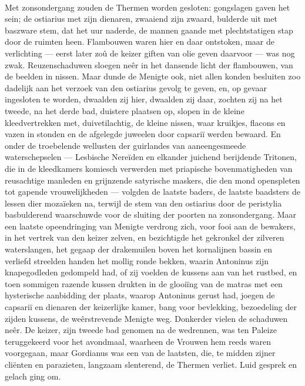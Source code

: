 \documentclass[a4paper, 12pt, oneside, dutch]{article}
\begin{document}
\paragraph{}
Met zonsondergang zouden de Thermen worden gesloten: gongslagen gaven het sein; de ostiarius met zijn dienaren, zwaaiend zijn zwaard, bulderde uit met baszware stem, dat het uur naderde, de mannen gaande met plechtstatigen stap door de ruimten heen. Flambouwen waren hier en daar ontstoken, maar de verlichting --- eerst later zoû de keizer giften van olie geven daarvoor --- was nog zwak. Reuzenschaduwen sloegen neêr in het dansende licht der flambouwen, van de beelden in nissen. Maar dunde de Menigte ook, niet allen konden besluiten zoo dadelijk aan het verzoek van den ostiarius gevolg te geven, en, op gevaar ingesloten te worden, dwaalden zij hier, dwaalden zij daar, zochten zij na het tweede, na het derde bad, duistere plaatsen op, slopen in de kleine kleedvertrekken met, duivetilachtig, de kleine nissen, waar kruikjes, flacons en vazen in stonden en de afgelegde juweelen door capsariï werden bewaard. En onder de troebelende wellusten der guirlandes van aaneengesmeede waterschepselen --- Lesbische Nereïden en elkander juichend berijdende Tritonen, die in de kleedkamers komiesch verwerden met priapische bovenmatigheden van reusachtige manleden en grijnzende satyrische maskers, die den mond openspleten tot gapende vrouwelijkheden --- volgden de laatste baders, de laatste baadsters de lessen dier mozaïeken na, terwijl de stem van den ostiarius door de peristylia basbulderend waarschuwde voor de sluiting der poorten na zonsondergang. Maar een laatste opeendringing van Menigte verdrong zich, voor fooi aan de bewakers, in het vertrek van den keizer zelven, en bezichtigde het gekronkel der zilveren waterslangen, het gegaap der drakemuilen boven het kornalijnen bassin en verliefd streelden handen het mollig ronde bekken, waarin Antoninus zijn knapegodleden gedompeld had, of zij voelden de kussens aan van het rustbed, en toen sommigen razende kussen drukten in de glooiïng van de matras met een hysterische aanbidding der plaats, waarop Antoninus gerust had, joegen de capsariï en dienaren der keizerlijke kamer, bang voor bevlekking, bezoedeling der zijden kussens, de weêrstrevende Menigte weg. Donkerder vielen de schaduwen neêr. De keizer, zijn tweede bad genomen na de wedrennen, was ten Paleize teruggekeerd voor het avondmaal, waarheen de Vrouwen hem reeds waren voorgegaan, maar Gordianus was een van de laatsten, die, te midden zijner cliënten en parazieten, langzaam slenterend, de Thermen verliet. Luid gesprek en gelach ging om.
\end{document}
